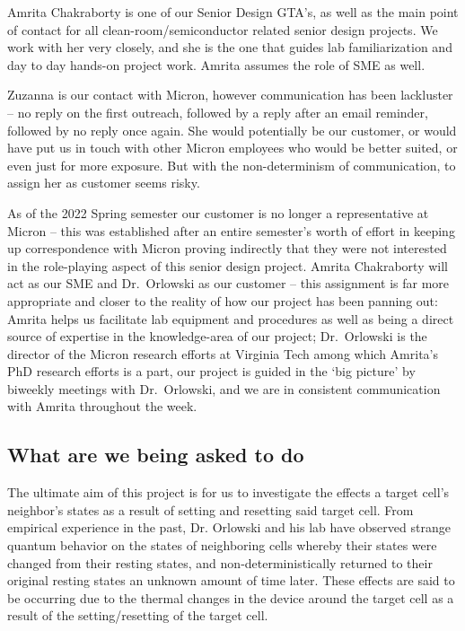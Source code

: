 \documentclass{article}
\begin{document}
        Amrita Chakraborty is one of our Senior Design GTA's, as well as the main point of contact for all
        clean-room/semiconductor related senior design projects. We work with her very closely, and she is the one that
        guides lab familiarization and day to day hands-on project work. Amrita assumes the role of SME as well.

        Zuzanna is our contact with Micron, however communication has been lackluster -- no reply on the first outreach,
        followed by a reply after an email reminder, followed by no reply once again. She would potentially be our
        customer, or would have put us in touch with other Micron employees who would be better suited, or even just for
        more exposure. But with the non-determinism of communication, to assign her as customer seems risky. 
        
        As of the 2022 Spring semester our customer is no longer a representative at Micron – this was established after
        an entire semester’s worth of effort in keeping up correspondence with Micron proving indirectly that they were
        not interested in the role-playing aspect of this senior design project. Amrita Chakraborty will act as our SME
        and Dr.\ Orlowski as our customer – this assignment is far more appropriate and closer to the reality of how our
        project has been panning out: Amrita helps us facilitate lab equipment and procedures as well as being a direct
        source of expertise in the knowledge-area of our project; Dr.\ Orlowski is the director of the Micron research
        efforts at Virginia Tech among which Amrita’s PhD research efforts is a part, our project is guided in the ‘big
        picture’ by biweekly meetings with Dr.\ Orlowski, and we are in consistent communication with Amrita throughout
        the week.
      
      \newpage
      \subsection{What are we being asked to do} 
        The ultimate aim of this project is for us to investigate the effects a target cell's neighbor's states as a
        result of setting and resetting said target cell. From empirical experience in the past, Dr. Orlowski and his
        lab have observed strange quantum behavior on the states of neighboring cells whereby their states were changed
        from their resting states, and non-deterministically returned to their original resting states an unknown amount
        of time later. These effects are said to be occurring due to the thermal changes in the device around the target
        cell as a result of the setting/resetting of the target cell.
\end{document}
